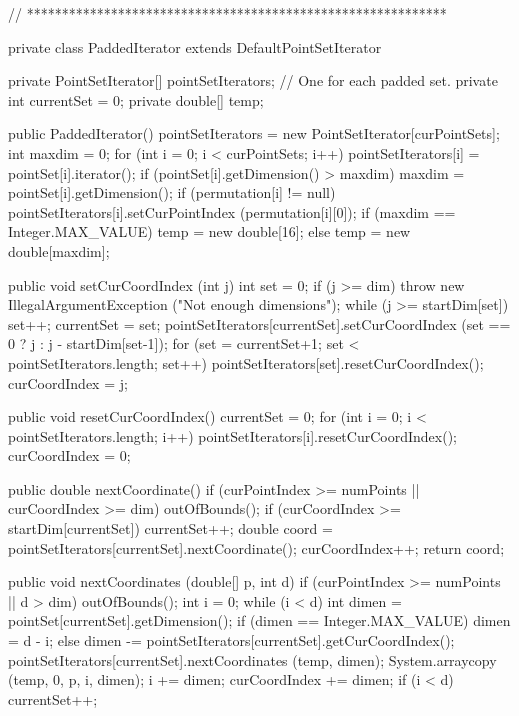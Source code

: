 \begin{code}
\begin{hide}
   // ************************************************************

   private class PaddedIterator extends DefaultPointSetIterator {

      private PointSetIterator[] pointSetIterators; // One for each padded set.
      private int currentSet = 0;
      private double[] temp;

      public PaddedIterator() {
         pointSetIterators = new PointSetIterator[curPointSets];
         int maxdim = 0;
         for (int i = 0; i < curPointSets; i++) {
            pointSetIterators[i] = pointSet[i].iterator();
            if (pointSet[i].getDimension() > maxdim)
               maxdim = pointSet[i].getDimension();
            if (permutation[i] != null)
               pointSetIterators[i].setCurPointIndex (permutation[i][0]);
         }
         if (maxdim == Integer.MAX_VALUE)
            temp = new double[16];
         else
            temp = new double[maxdim];
      }

      public void setCurCoordIndex (int j) {
         int set = 0;
         if (j >= dim)
            throw new IllegalArgumentException ("Not enough dimensions");
         while (j >= startDim[set])
            set++;
         currentSet = set;
         pointSetIterators[currentSet].setCurCoordIndex 
            (set == 0 ? j : j - startDim[set-1]);
         for (set = currentSet+1; set < pointSetIterators.length; set++)
            pointSetIterators[set].resetCurCoordIndex();
         curCoordIndex = j;
      }

      public void resetCurCoordIndex() {
         currentSet = 0;
         for (int i = 0; i < pointSetIterators.length; i++)
            pointSetIterators[i].resetCurCoordIndex();
         curCoordIndex = 0;
      }

      public double nextCoordinate() {
         if (curPointIndex >= numPoints || curCoordIndex >= dim)
            outOfBounds();
         if (curCoordIndex >= startDim[currentSet])
            currentSet++;
         double coord = pointSetIterators[currentSet].nextCoordinate();
         curCoordIndex++;
         return coord;
      }

      public void nextCoordinates (double[] p, int d) {
         if (curPointIndex >= numPoints || d > dim)
            outOfBounds();
         int i = 0;
         while (i < d) {
            int dimen = pointSet[currentSet].getDimension();
            if (dimen == Integer.MAX_VALUE)
               dimen = d - i;
            else
               dimen -= pointSetIterators[currentSet].getCurCoordIndex();
            pointSetIterators[currentSet].nextCoordinates (temp, dimen);
            System.arraycopy (temp, 0, p, i, dimen);
            i += dimen;
            curCoordIndex += dimen;
            if (i < d)
               currentSet++;
         }
      }

}
\end{hide}
\end{code}
